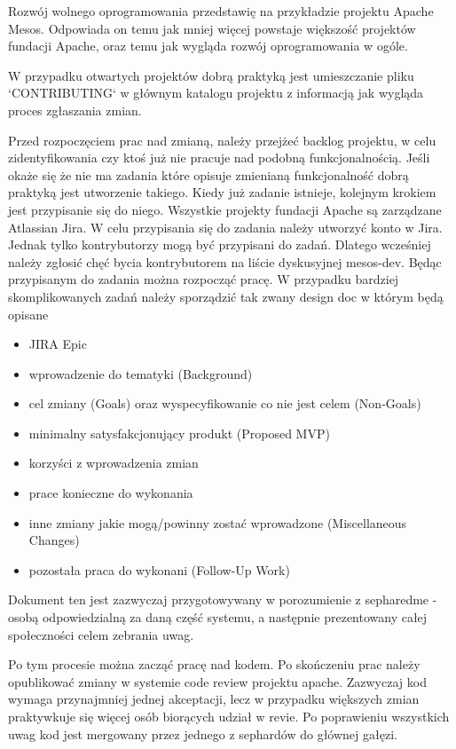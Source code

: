 \documentclass[a4paper,11pt,twoside]{report}
\theoremstyle{definition}
\begin{document}
Rozwój wolnego oprogramowania przedstawię na przykładzie projektu Apache 
Mesos. Odpowiada on temu jak mniej więcej powstaje większość projektów 
fundacji Apache, oraz temu jak wygląda rozwój oprogramowania w ogóle.

W przypadku otwartych projektów dobrą praktyką jest umieszczanie pliku 
`CONTRIBUTING` w głównym katalogu projektu z informacją jak wygląda proces 
zgłaszania zmian.


Przed rozpoczęciem prac nad zmianą, należy przejżeć backlog projektu, w 
celu zidentyfikowania czy ktoś już nie pracuje nad podobną 
funkcjonalnością. Jeśli okaże się że nie ma zadania które opisuje 
zmienianą funkcjonalność dobrą praktyką jest utworzenie takiego. Kiedy 
już zadanie istnieje, kolejnym krokiem jest przypisanie się do niego. 
Wszystkie projekty fundacji Apache są zarządzane Atlassian Jira. W celu 
przypisania się do zadania należy utworzyć konto w Jira. Jednak tylko 
kontrybutorzy mogą być przypisani do zadań. Dlatego wcześniej należy 
zgłosić chęć bycia kontrybutorem na liście dyskusyjnej mesos-dev. Będąc 
przypisanym do zadania można rozpocząć pracę. W przypadku bardziej 
skomplikowanych zadań  należy sporządzić tak zwany design doc w którym 
będą opisane 

\begin{itemize}
    \item JIRA Epic
    \item wprowadzenie do tematyki (Background)
    \item cel zmiany (Goals) oraz wyspecyfikowanie co nie jest celem (Non-Goals)
    \item minimalny satysfakcjonujący produkt (Proposed MVP)
    \item korzyści z wprowadzenia zmian
    \item prace konieczne do wykonania
    \item inne zmiany jakie mogą/powinny zostać wprowadzone (Miscellaneous 
Changes)
    \item pozostała praca do wykonani (Follow-Up Work)
\end{itemize}

Dokument ten jest zazwyczaj przygotowywany w porozumienie z sepharedme - osobą 
odpowiedzialną za daną część systemu, a następnie prezentowany całej 
społeczności celem zebrania uwag.

Po tym procesie można zacząć pracę nad kodem. Po skończeniu prac należy 
opublikować zmiany w systemie code review projektu apache. Zazwyczaj kod 
wymaga przynajmniej jednej akceptacji, lecz w przypadku większych zmian 
praktywkuje się więcej osób biorących udział w revie. Po poprawieniu 
wszystkich uwag kod jest mergowany przez jednego z sephardów do głównej 
gałęzi.
\end{document}
